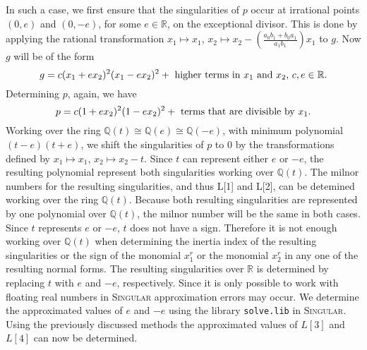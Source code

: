 \documentclass[noend]{amsproc}
\theoremstyle{definition}
\begin{document}
In such a case, we first ensure that the singularities of $p$ occur at
irrational points $(0,e)$ and $(0,-e)$, for some $e\in\mathbb R$, on the
exceptional divisor. This is done by applying the rational transformation
$x_1\mapsto x_1$, $x_2\mapsto x_2-(\frac{a_0b_1+b_0a_1}{a_1b_1})x_1$ to $g$.
Now $g$ will be of the form
\[g=c(x_1+ex_2)^2(x_1-ex_2)^2+\textnormal{ higher terms in $x_1$ and $x_2$,
$c,e\in\mathbb R$}.\]
Determining $p$, again, we have
\[p=c(1+ex_2)^2(1-ex_2)^2+\textnormal{ terms that are divisible by $x_1$.}\]
 Working over the ring $\mathbb Q(t)\cong \mathbb Q(e)\cong \mathbb Q (-e)$,
 with minimum polynomial $(t-e)(t+e)$, we shift the singularities of $p$ to $0$
 by the transformations defined by $x_1\mapsto x_1$, $x_2\mapsto x_2-t$. Since
 $t$ can represent either $e$ or $-e$, the resulting polynomial represent both
 singularities working over $\mathbb Q(t)$. The milnor numbers for the
 resulting singularities, and thus L[1] and L[2], can be detemined working over
 the ring $\mathbb Q(t)$. Because both resulting singularities are represented by
 one polynomial over $\mathbb Q(t)$, the milnor number will be the same in both
 cases. Since $t$ represents $e$ or $-e$, $t$ does not have a sign. Therefore
 it is not enough working over $\mathbb Q(t)$ when determining the inertia
 index of the resulting singularities or the sign of the monomial $x_1^r$ or
 the monomial $x_2^r$ in  any one of the resulting normal forms. The resulting
 singularities over $\mathbb R$ is determined by replacing $t$ with $e$ and
 $-e$, respectively. Since it is only possible to work with floating real
 numbers in \textsc{Singular} approximation errors may occur. We determine the
 approximated values of $e$ and $-e$ using the library {\tt solve.lib}
 \cite{solve.lib} in \textsc{Singular}. Using the previously discussed methods
 the approximated values of $L[3]$ and $L[4]$ can now be determined.
\end{document}
